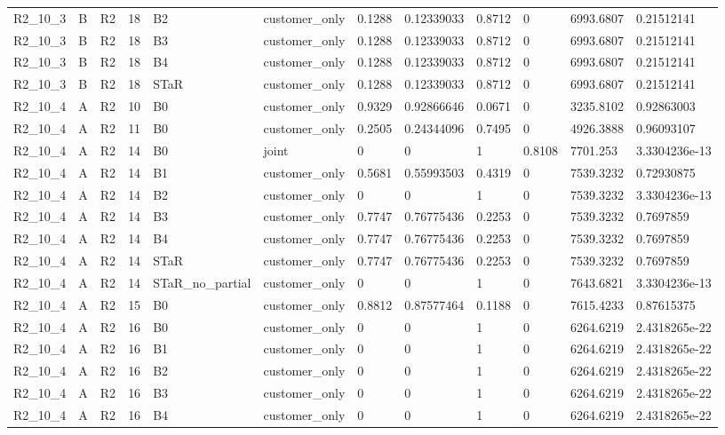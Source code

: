 \begin{longtable}{llllllllllll}
R2\_10\_3 & B & R2 & 18 & B2 & customer\_only & 0.1288 & 0.12339033 & 0.8712 & 0 & 6993.6807 & 0.21512141 \\
R2\_10\_3 & B & R2 & 18 & B3 & customer\_only & 0.1288 & 0.12339033 & 0.8712 & 0 & 6993.6807 & 0.21512141 \\
R2\_10\_3 & B & R2 & 18 & B4 & customer\_only & 0.1288 & 0.12339033 & 0.8712 & 0 & 6993.6807 & 0.21512141 \\
R2\_10\_3 & B & R2 & 18 & STaR & customer\_only & 0.1288 & 0.12339033 & 0.8712 & 0 & 6993.6807 & 0.21512141 \\
R2\_10\_4 & A & R2 & 10 & B0 & customer\_only & 0.9329 & 0.92866646 & 0.0671 & 0 & 3235.8102 & 0.92863003 \\
R2\_10\_4 & A & R2 & 11 & B0 & customer\_only & 0.2505 & 0.24344096 & 0.7495 & 0 & 4926.3888 & 0.96093107 \\
R2\_10\_4 & A & R2 & 14 & B0 & joint & 0 & 0 & 1 & 0.8108 & 7701.253 & 3.3304236e-13 \\
R2\_10\_4 & A & R2 & 14 & B1 & customer\_only & 0.5681 & 0.55993503 & 0.4319 & 0 & 7539.3232 & 0.72930875 \\
R2\_10\_4 & A & R2 & 14 & B2 & customer\_only & 0 & 0 & 1 & 0 & 7539.3232 & 3.3304236e-13 \\
R2\_10\_4 & A & R2 & 14 & B3 & customer\_only & 0.7747 & 0.76775436 & 0.2253 & 0 & 7539.3232 & 0.7697859 \\
R2\_10\_4 & A & R2 & 14 & B4 & customer\_only & 0.7747 & 0.76775436 & 0.2253 & 0 & 7539.3232 & 0.7697859 \\
R2\_10\_4 & A & R2 & 14 & STaR & customer\_only & 0.7747 & 0.76775436 & 0.2253 & 0 & 7539.3232 & 0.7697859 \\
R2\_10\_4 & A & R2 & 14 & STaR\_no\_partial & customer\_only & 0 & 0 & 1 & 0 & 7643.6821 & 3.3304236e-13 \\
R2\_10\_4 & A & R2 & 15 & B0 & customer\_only & 0.8812 & 0.87577464 & 0.1188 & 0 & 7615.4233 & 0.87615375 \\
R2\_10\_4 & A & R2 & 16 & B0 & customer\_only & 0 & 0 & 1 & 0 & 6264.6219 & 2.4318265e-22 \\
R2\_10\_4 & A & R2 & 16 & B1 & customer\_only & 0 & 0 & 1 & 0 & 6264.6219 & 2.4318265e-22 \\
R2\_10\_4 & A & R2 & 16 & B2 & customer\_only & 0 & 0 & 1 & 0 & 6264.6219 & 2.4318265e-22 \\
R2\_10\_4 & A & R2 & 16 & B3 & customer\_only & 0 & 0 & 1 & 0 & 6264.6219 & 2.4318265e-22 \\
R2\_10\_4 & A & R2 & 16 & B4 & customer\_only & 0 & 0 & 1 & 0 & 6264.6219 & 2.4318265e-22 \\

\end{longtable}

